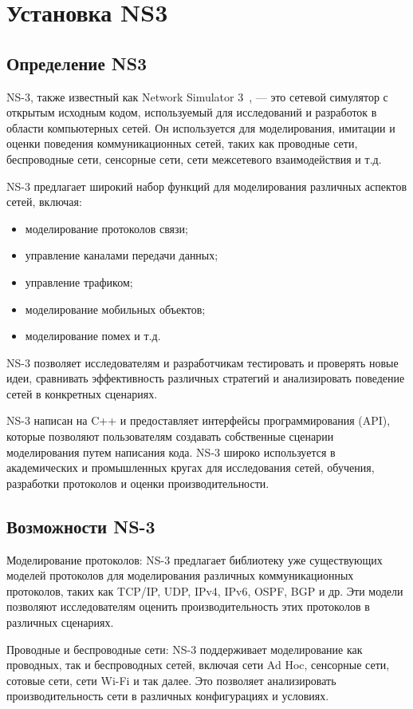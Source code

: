 \chapter{Установка NS3}
\section{Определение NS3}
NS-3, также известный как Network Simulator 3~\cite{ns3}, --- это сетевой
симулятор с открытым исходным кодом, используемый для исследований и
разработок в области компьютерных сетей. Он используется для
моделирования, имитации и оценки поведения коммуникационных сетей,
таких как проводные сети, беспроводные сети, сенсорные сети, сети
межсетевого взаимодействия и т.д.

NS-3 предлагает широкий набор функций для моделирования различных аспектов сетей, включая: 
\begin{itemize}
    \item моделирование протоколов связи;
    \item управление каналами передачи данных;
    \item управление трафиком;
    \item моделирование мобильных объектов;
    \item моделирование помех и т.д.
\end{itemize}


NS-3 позволяет исследователям и разработчикам тестировать и проверять
новые идеи, сравнивать эффективность различных стратегий и
анализировать поведение сетей в конкретных сценариях.

NS-3 написан на C++ и предоставляет интерфейсы программирования (API),
которые позволяют пользователям создавать собственные сценарии
моделирования путем написания кода. NS-3 широко используется в
академических и промышленных кругах для исследования сетей, обучения,
разработки протоколов и оценки производительности.

\section{Возможности NS-3}

Моделирование протоколов: NS-3 предлагает библиотеку уже существующих
моделей протоколов для моделирования различных коммуникационных
протоколов, таких как TCP/IP, UDP, IPv4, IPv6, OSPF, BGP и др. Эти
модели позволяют исследователям оценить производительность этих
протоколов в различных сценариях.

Проводные и беспроводные сети: NS-3 поддерживает моделирование как
проводных, так и беспроводных сетей, включая сети Ad Hoc, сенсорные
сети, сотовые сети, сети Wi-Fi и так далее. Это позволяет
анализировать производительность сети в различных конфигурациях и
условиях.

